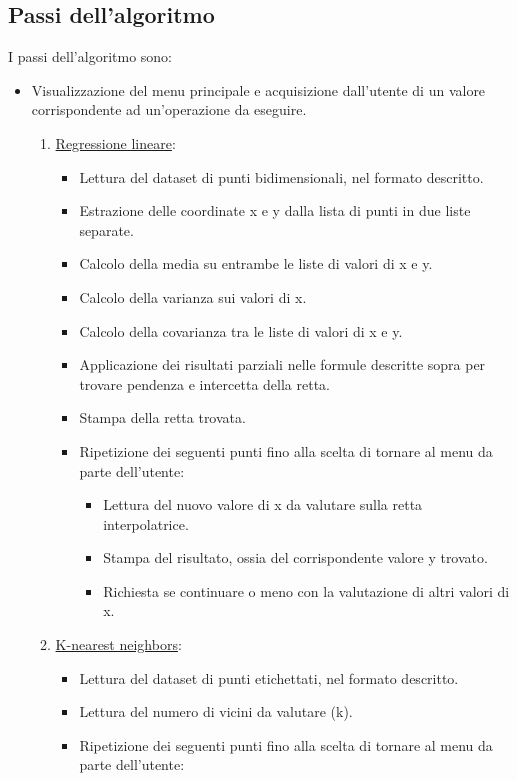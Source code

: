 \documentclass[11pt]{article}
\theoremstyle{definition}
\begin{document}
\subsection{Passi dell'algoritmo}
I passi dell'algoritmo sono:
\begin{itemize}
\item Visualizzazione del menu principale e acquisizione dall'utente di un valore corrispondente ad un'operazione da eseguire.
\begin{enumerate}
\item \underline{Regressione lineare}: 
          \begin{itemize}
          \item Lettura del dataset di punti bidimensionali, nel formato descritto.
         \item Estrazione delle coordinate x e y dalla lista di punti in due liste separate.
         \item Calcolo della media su entrambe le liste di valori di x e y.
         \item Calcolo della varianza sui valori di x.
         \item Calcolo della covarianza tra le liste di valori di x e y.
         \item Applicazione dei risultati parziali nelle formule descritte sopra per trovare pendenza e intercetta della retta.
         \item Stampa della retta trovata.
         \item Ripetizione dei seguenti punti fino alla scelta di tornare al menu da parte dell'utente:
         \begin{itemize}
             \item Lettura del nuovo valore di x da valutare sulla retta interpolatrice.
        	 \item Stampa del risultato, ossia del corrispondente valore y trovato. 
         	\item Richiesta se continuare o meno con la valutazione di altri valori di x.
         \end{itemize}
       \end{itemize}
     \item \underline{K-nearest neighbors}: 
       \begin{itemize}
         \item Lettura del dataset di punti etichettati, nel formato descritto.
         \item Lettura del numero di vicini da valutare (k).
         \item Ripetizione dei seguenti punti fino alla scelta di tornare al menu da parte dell'utente:

\end{itemize}
\end{enumerate}
\end{itemize}
\end{document}
